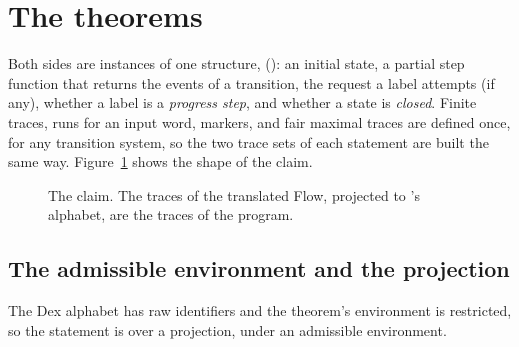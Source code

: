 \section{The theorems}
\label{sec:theorems}

Both sides are instances of one structure,
 (): an initial
state, a partial step function that returns the events of a transition, the
request a label attempts (if any), whether a label is a \emph{progress
step}, and whether a state is \emph{closed}. Finite traces, runs for an
input word, markers, and fair maximal traces are defined once, for any
transition system, so the two trace sets of each statement are built the
same way. Figure~\ref{fig:overview} shows the shape of the claim.

\begin{figure}[t]
\centering
{}
\caption{The claim. The traces of the translated Flow, projected to
\Lang{}'s alphabet, are the traces of the program.}
\label{fig:overview}
\end{figure}

\subsection{The admissible environment and the projection}

The Dex alphabet has raw identifiers and the theorem's environment is
restricted, so the statement is over a projection, under an admissible
environment.

